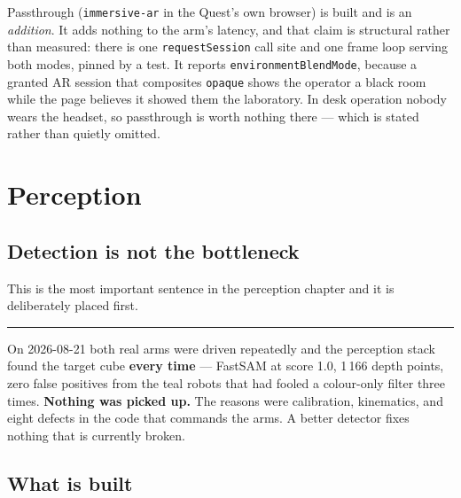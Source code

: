 \documentclass[11pt,a4paper,oneside]{report}
\newcommand{\code}[1]{\texttt{\small #1}}
\newcommand{\keyfact}[1]{%
  \par\vspace{7pt}\noindent
  \hspace*{0pt}\textcolor{srlblue}{\rule{2.5pt}{\dimexpr\baselineskip\relax}}%
  \hspace{9pt}%
  \begin{minipage}[t]{\dimexpr\textwidth-14pt\relax}
  \small #1
  \end{minipage}\par\vspace{7pt}}
\begin{document}
Passthrough (\code{immersive-ar} in the Quest's own browser) is built and is an
\emph{addition}. It adds nothing to the arm's latency, and that claim is
structural rather than measured: there is one \code{requestSession} call site
and one frame loop serving both modes, pinned by a test. It reports
\code{environmentBlendMode}, because a granted AR session that composites
\code{opaque} shows the operator a black room while the page believes it showed
them the laboratory. In desk operation nobody wears the headset, so passthrough
is worth nothing there --- which is stated rather than quietly omitted.

\chapter{Perception}

\section{Detection is not the bottleneck}

This is the most important sentence in the perception chapter and it is
deliberately placed first.

\keyfact{On 2026-08-21 both real arms were driven repeatedly and the perception
stack found the target cube \textbf{every time} --- FastSAM at score 1.0, 1\,166
depth points, zero false positives from the teal robots that had fooled a
colour-only filter three times. \textbf{Nothing was picked up.} The reasons
were calibration, kinematics, and eight defects in the code that commands the
arms. A better detector fixes nothing that is currently broken.}

\section{What is built}
\end{document}
